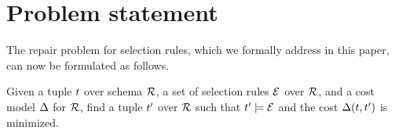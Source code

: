 \section{Problem statement}
\label{sec:problem}

The repair problem for selection rules, which we formally address in this paper, can now be formulated as follows.

\begin{definition}
    Given a tuple $t$ over schema $\mathcal{R}$, a set of selection rules $\mathcal{E}$ over $\mathcal{R}$, and a cost model $\Delta$ for $\mathcal{R}$, find a tuple $t'$ over $\mathcal{R}$ such that $t' \models \mathcal{E}$ and the cost $\Delta(t,t')$ is minimized.
\end{definition}
